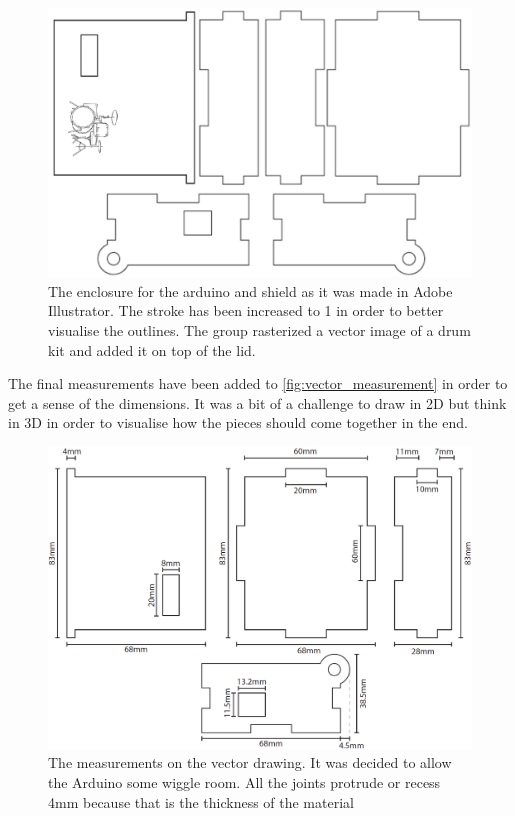 \begin{figure}[htb]
\centering
\includegraphics[scale = 0.5]{Figure/vector_case.png}
\caption{The enclosure for the arduino and shield as it was made in Adobe Illustrator. The stroke has been increased to 1 in order to better visualise the outlines. The group rasterized a vector image of a drum kit and added it on top of the lid.}
\label{fig:vector_case}
\end{figure}

The final measurements have been added to \autoref{fig:vector_measurement} in order to get a sense of the dimensions. It was a bit of a challenge to draw in 2D but think in 3D in order to visualise how the pieces should come together in the end.

\begin{figure}[htb]
\centering
\includegraphics[scale = 0.40]{Figure/vector_case_measure.png}
\caption{The measurements on the vector drawing. It was decided to allow the Arduino some wiggle room. All the joints protrude or recess 4mm because that is the thickness of the material}
\label{fig:vector_measurement}
\end{figure}
